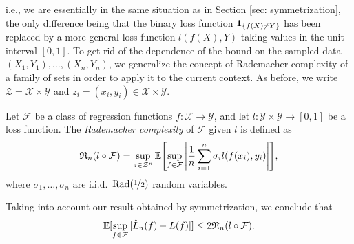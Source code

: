 i.e., we are essentially in the same situation as in Section \ref{sec: symmetrization}, the only difference being that the binary loss function $\indSet{f(X) \neq Y}$ has been replaced by a more general loss function $l(f(X), Y)$ taking values in the unit interval $[0, 1]$. To get rid of the dependence of the bound on the sampled data $(X_1, Y_1), \dots, (X_n, Y_n)$, we generalize the concept of Rademacher complexity of a family of sets in order to apply it to the current context. As before, we write $\mathcal{Z} = \mathcal{X} \times \mathcal{Y}$ and $z_i = (x_i, y_i) \in \mathcal{X} \times \mathcal{Y}$.

\begin{definition}
\label{def: rademacher complexity for general loss}
Let $\mathcal{F}$ be a class of regression functions $f \colon \mathcal{X} \to \mathcal{Y}$, and let $l \colon \mathcal{Y} \times \mathcal{Y} \to [0, 1]$ be a loss function. The \emph{Rademacher complexity} of $\mathcal{F}$ given $l$ is defined as
\[
    \mathfrak{R}_n(l \circ \mathcal{F}) = \sup_{z \in \mathcal{Z}^n} \Exp\left[\sup_{f \in \mathcal{F}} \abs{\frac{1}{n} \sum_{i=1}^n \sigma_i l(f(x_i), y_i)}\right],
\]
where $\sigma_1, \dots, \sigma_n$ are i.i.d.\ $\operatorname{Rad}(\nicefrac{1}{2})$ random variables.
\end{definition}
Taking into account our result obtained by symmetrization, we conclude that
\[
    \Exp[\sup_{f \in \mathcal{F}} \abs*{\hat{L}_n(f) - L(f)}] \leq 2 \mathfrak{R}_n(l \circ \mathcal{F}).
\]

